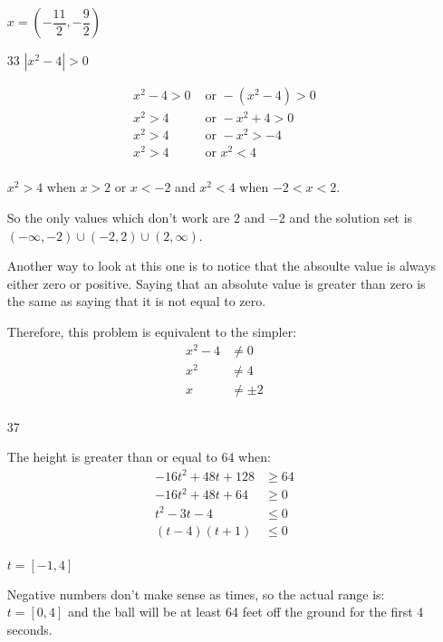 \documentclass[fleqn,addpoints]{exam}
\begin{document}
\begin{itemize}
$x = \left( -\dfrac{11}{2}, -\dfrac{9}{2} \right)$

\item[33]
$|x^2-4| > 0$

\begin{align*}
  x^2-4 > 0 & \text{ or } -(x^2-4) > 0 \\
  x^2 > 4 & \text{ or } -x^2 + 4 > 0 \\
  x^2 > 4 & \text{ or } -x^2 > -4 \\
  x^2 > 4 & \text{ or } x^2 < 4 \\
\end{align*}

$x^2>4$ when $x > 2 \text{ or } x < -2$ and $x^2<4$ when $-2 < x < 2$.

So the only values which don't work are $2$ and $-2$ and the solution set is $(-\infty, -2) \cup (-2, 2) \cup (2, \infty)$.

Another way to look at this one is to notice that the absoulte value is always either zero or positive.  Saying that
an absolute value is greater than zero is the same as saying that it is not equal to zero.  

Therefore, this problem is equivalent to the simpler:
\begin{align*}
  x^2 - 4 & \neq 0 \\
  x^2 & \neq 4 \\
  x & \neq \pm 2 \\
\end{align*}

\item[37]

The height is greater than or equal to 64 when:
\begin{align*}
  -16t^2 + 48t + 128 &\geq 64 \\
  -16t^2 + 48t + 64 &\geq 0 \\
  t^2 -3t - 4 &\leq 0 \\
  (t-4)(t+1) &\leq 0 \\
\end{align*}

$t = [-1, 4]$

Negative numbers don't make sense as times, so the actual range is: $t = [0, 4]$ and the ball will be at least 64 feet
off the ground for the first 4 seconds.

\end{itemize}

\pagebreak
\end{document}
